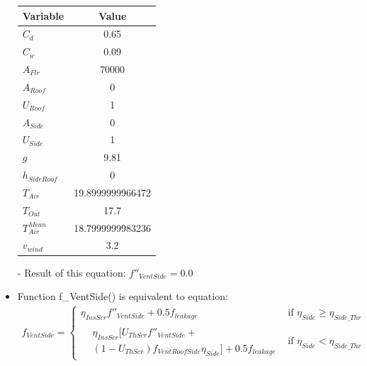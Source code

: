 \documentclass[a4paper]{article}
\numberwithin{equation}{section}
\begin{document}
\begin{itemize}
        \begin{table}[H]
          \centering
          \begin{tabular}{@{}lS[table-format=5.13]@{}}
            \toprule
            \textbf{Variable}  & \textbf{Value}   \\
            \midrule
            \(C_d\)            & 0.65             \\
            \(C_w\)            & 0.09             \\
            \(A_{Flr}\)        & 70000            \\
            \(A_{Roof}\)       & 0                \\
            \(U_{Roof}\)       & 1                \\
            \(A_{Side}\)       & 0                \\
            \(U_{Side}\)       & 1                \\
            \(g\)              & 9.81             \\
            \(h_{SideRoof}\)   & 0                \\
            \(T_{Air}\)        & 19.8999999966472 \\
            \(T_{Out}\)        & 17.7             \\
            \(T_{Air}^{Mean}\) & 18.7999999983236 \\
            \(v_{wind}\)       & 3.2              \\
            \bottomrule
          \end{tabular}
        \end{table}

  \item[-] Result of this equation: \(f''_{VentSide} = 0.0\)

  \item Function f\_VentSide() is equivalent to equation:\label{fVentSide}
        \begin{gather*}
          f_{VentSide} =
          \begin{cases}
            \eta_{InsScr} f''_{VentSide} + 0.5f_{leakage} & \text{if~} \eta_{Side} \geq \eta_{Side\_Thr} \\
            \begin{split}
              & \eta_{InsScr} [U_{ThScr}f''_{VentSide} + \\
              & (1-U_{ThScr})f_{VentRoofSide} \eta_{Side}] + 0.5 f_{leakage}
            \end{split}                   & \text{if~} \eta_{Side} < \eta_{Side\_Thr}
          \end{cases}
        \end{gather*}


\end{itemize}
\end{document}

